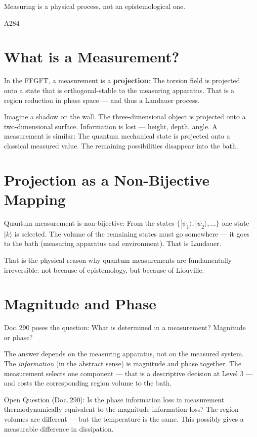 \label{ch:messung}

\epigraph{Measuring is a physical process, not an epistemological one.}{A284}

\section{What is a Measurement?}

In the FFGFT, a measurement is a \textbf{projection}: The torsion field
is projected onto a state that is orthogonal-stable to the measuring apparatus.
That is a region reduction in phase space --- and thus a
Landauer process. 

\begin{laierspur}
Imagine a shadow on the wall. The three-dimensional object
is projected onto a two-dimensional surface. Information is lost ---
height, depth, angle. A measurement is similar: The quantum mechanical
state is projected onto a classical measured value. The remaining
possibilities disappear into the bath.
\end{laierspur}

\section{Projection as a Non-Bijective Mapping}

Quantum measurement is non-bijective: From the states
$\{|\psi_1\rangle, |\psi_2\rangle, \ldots\}$ one state $|k\rangle$
is selected. The volume of the remaining states must go somewhere ---
it goes to the bath (measuring apparatus and environment). That is Landauer. 

That is the physical reason why quantum measurements are fundamentally
irreversible: not because of epistemology, but because of Liouville.

\section{Magnitude and Phase}

Doc.\,290 poses the question: What is determined in a measurement?
Magnitude or phase?

The answer depends on the measuring apparatus, not on the measured system.
The \emph{information} (in the abstract sense) is magnitude and phase together.
The measurement selects one component --- that is a
descriptive decision at Level 3 --- and costs the corresponding
region volume to the bath.

Open Question  (Doc.\,290): Is the phase information loss
in measurement thermodynamically equivalent to the magnitude information loss?
The region volumes are different --- but the temperature is the same.
This possibly gives a measurable difference in dissipation.